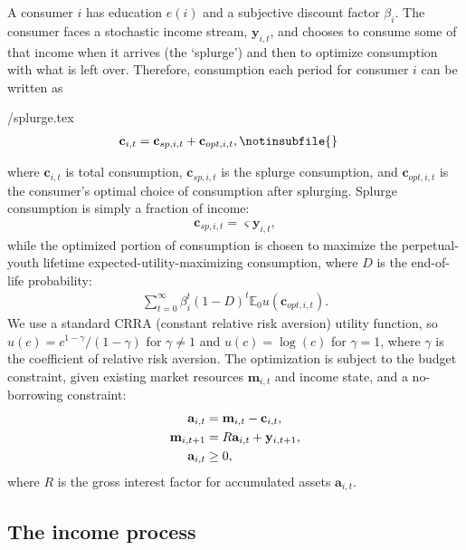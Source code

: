 \documentclass[\econtexRoot/HAFiscal]{subfiles}
\begin{document}
A consumer $i$ has education $e(i)$ and a subjective discount factor $\beta_i$. The consumer faces a stochastic income stream, $\mathbf{y}_{i,t}$, and chooses to consume some of that income when it arrives (the `splurge') and then to optimize consumption with what is left over. Therefore, consumption each period for consumer $i$ can be written as
\begin{verbatimwrite}{\EqDir/splurge.tex}
\begin{align}
  \mathbf{c}_{i,t} &= \mathbf{c}_{sp,i,t} + \mathbf{c}_{opt,i,t}, \notinsubfile{\label{sec:model}}
\end{align}
\end{verbatimwrite}

where $\mathbf{c}_{i,t}$ is total consumption, $\mathbf{c}_{sp,i,t}$ is the splurge consumption, and $\mathbf{c}_{opt,i,t}$ is the consumer's optimal choice of consumption after splurging. Splurge consumption is simply a fraction of income:
\begin{align}
  \mathbf{c}_{sp,i,t} = \varsigma \mathbf{y}_{i,t},
\end{align}
while the optimized portion of consumption is chosen to maximize the perpetual-youth lifetime expected-utility-maximizing consumption, where $D$ is the end-of-life probability:
\begin{align}
  \sum_{t=0}^{\infty}\beta_i^t (1-D)^t \mathbb{E}_0 u(\mathbf{c}_{opt,i,t}).
\end{align}
We use a standard CRRA (constant relative risk aversion) utility function, so $u(c) = c^{1-\gamma}/(1-\gamma)$ for $\gamma \neq 1$ and $u(c) = \log(c)$ for $\gamma=1$, where $\gamma$ is the coefficient of relative risk aversion. The optimization is subject to the budget constraint, given existing market resources $\mathbf{m}_{i,t}$ and income state, and a no-borrowing constraint: 
\begin{align}
  \mathbf{a}_{i,t} &= \mathbf{m}_{i,t} - \mathbf{c}_{i,t}, \notag \\ 
  \mathbf{m}_{i,t+1} &= R \mathbf{a}_{i,t} + \mathbf{y}_{i,t+1}, \\
  \mathbf{a}_{i,t} &\geq 0,   \notag
\end{align}
where $R$ is the gross interest factor for accumulated assets $\mathbf{a}_{i,t}$.

\hypertarget{the-income-process}{}\par\subsection{The income process}
\end{document}
